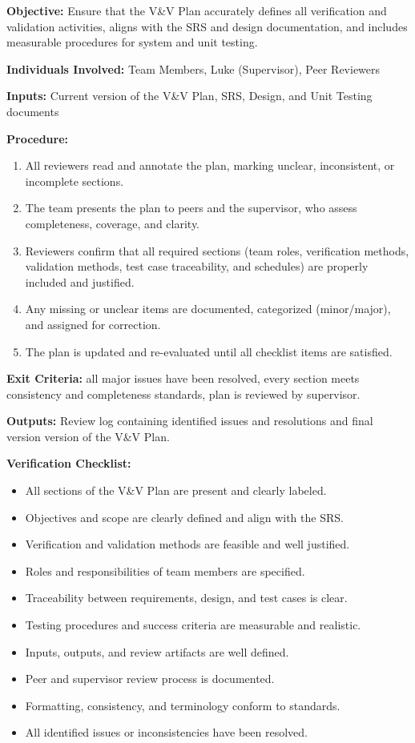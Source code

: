 \documentclass[12pt, titlepage]{article}
\begin{document}


\noindent\textbf{Objective: }
Ensure that the V\&V Plan accurately defines all verification and validation
activities, aligns with the SRS and design documentation, and includes
measurable procedures for system and unit testing.

\noindent\textbf{Individuals Involved: } Team Members, Luke (Supervisor), Peer Reviewers

\noindent\textbf{Inputs: } Current version of the V\&V Plan, SRS, Design, and Unit Testing documents

\noindent\textbf{Procedure: }
\begin{enumerate}
  \item All reviewers read and annotate the plan, marking unclear, inconsistent, or incomplete sections.
  \item The team presents the plan to peers and the supervisor, who assess completeness, coverage, and clarity.
  \item Reviewers confirm that all required sections (team roles, verification methods, validation methods, test case traceability, and schedules) are properly included and justified.
  \item Any missing or unclear items are documented, categorized (minor/major), and assigned for correction.
  \item The plan is updated and re-evaluated until all checklist items are satisfied.
\end{enumerate}

\noindent\textbf{Exit Criteria: } all major issues have been resolved, every section meets consistency and completeness standards, plan is reviewed by supervisor.

\noindent\textbf{Outputs: } Review log containing identified issues and resolutions and final version version of the V\&V Plan.

\noindent\textbf{Verification Checklist:}

\begin{itemize}
  \item All sections of the V\&V Plan are present and clearly labeled.
  \item Objectives and scope are clearly defined and align with the SRS.
  \item Verification and validation methods are feasible and well justified.
  \item Roles and responsibilities of team members are specified.
  \item Traceability between requirements, design, and test cases is clear.
  \item Testing procedures and success criteria are measurable and realistic.
  \item Inputs, outputs, and review artifacts are well defined.
  \item Peer and supervisor review process is documented.
  \item Formatting, consistency, and terminology conform to standards.
  \item All identified issues or inconsistencies have been resolved.
\end{itemize}
\end{document}
